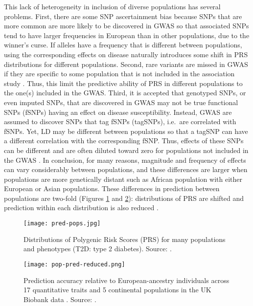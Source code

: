 This lack of heterogeneity in inclusion of diverse populations has several problems. First, there are some SNP ascertainment bias because SNPs that are more common are more likely to be discovered in GWAS so that associated SNPs tend to have larger frequencies in European than in other populations, due to the winner's curse. 
If alleles have a frequency that is different between populations, using the corresponding effects on disease naturally introduces some shift in PRS distributions for different populations.
Second, rare variants are missed in GWAS if they are specific to some population that is not included in the association study \cite[]{martin2019clinical}. Thus, this limit the predictive ability of PRS in different populations to the one(s) included in the GWAS.
Third, it is accepted that genotyped SNPs, or even imputed SNPs, that are discovered in GWAS may not be true functional SNPs (fSNPs) having an effect on disease susceptibility. Instead, GWAS are assumed to discover SNPs that tag fSNPs (tagSNPs), i.e.\ are correlated with fSNPs. 
Yet, LD may be different between populations so that a tagSNP can have a different correlation with the corresponding fSNP. Thus, effects of these SNPs can be different and are often diluted toward zero for populations not included in the GWAS \cite[]{carlson2013generalization}. 
In conclusion, for many reasons, magnitude and frequency of effects can vary considerably between populations, and these differences are larger when populations are more genetically distant such as African population with either European or Asian populations.
These differences in prediction between populations are two-fold (Figures \ref{fig:dist-shift} and \ref{fig:pop-pred}): distributions of PRS are shifted and prediction within each distribution is also reduced \cite[]{vilhjalmsson2015modeling,martin2019clinical}.

\begin{figure}[htpb]
\centerline{\texttt{[image: pred-pops.jpg]}}
\caption{Distributions of Polygenic Risk Scores (PRS) for many populations and phenotypes (T2D: type 2 diabetes). Source: \cite{martin2017human}.}
\label{fig:dist-shift}
\end{figure}

\begin{figure}[htpb]
\centerline{\texttt{[image: pop-pred-reduced.png]}}
\caption{Prediction accuracy relative to European-ancestry individuals across 17 quantitative traits and 5 continental populations in the UK Biobank data \cite[]{bycroft2017genome}. Source: \cite{martin2019clinical}.}
\label{fig:pop-pred}
\end{figure}


